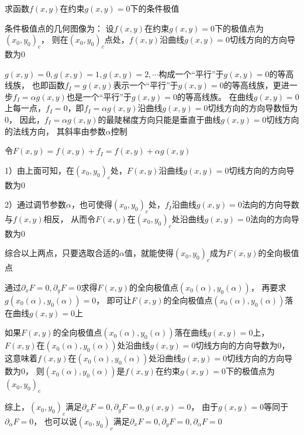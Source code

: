求函数$f(x,y)$在约束$g(x,y)=0$下的条件极值

条件极值点的几何图像为：
设$f(x,y)$在约束$g(x,y)=0$下的极值点为$(x_0,y_0)_c$，
则在$(x_0,y_0)_c$点处，$f(x,y)$沿曲线$g(x,y)=0$切线方向的方向导数为$0$

$g(x,y)=0,g(x,y)=1,g(x,y)=2,\cdots$构成一个“平行”于$g(x,y)=0$的等高线族，
也即函数$f_I=g(x,y)$表示一个“平行”于$g(x,y)=0$的等高线族，更进一步$f_I=\alpha g(x,y)$也是一个“平行”于$g(x,y)=0$的等高线族。
在曲线$g(x,y)=0$上每一点，$f_I=0$，即$f_I=\alpha g(x,y)$沿曲线$g(x,y)=0$切线方向的方向导数恒为$0$，
因此，$f_I=\alpha g(x,y)$的最陡梯度方向只能是垂直于曲线$g(x,y)=0$切线方向的法线方向，
其斜率由参数$\alpha$控制

令$F(x,y)=f(x,y)+f_I=f(x,y)+\alpha g(x,y)$

1）由上面可知，在$(x_0,y_0)_c$处，$F(x,y)$沿曲线$g(x,y)=0$切线方向的方向导数为$0$

2）通过调节参数$\alpha$，也可使得$(x_0,y_0)_c$处，$f_I$沿曲线$g(x,y)=0$法向的方向导数与$f(x,y)$相反，
从而令$F(x,y)$在$(x_0,y_0)_c$处沿曲线$g(x,y)=0$法向的方向导数为$0$

综合以上两点，只要选取合适的$\alpha$值，就能使得$(x_0,y_0)_c$成为$F(x,y)$的全向极值点

通过$\partial_x F=0,\partial_y F=0$求得$F(x,y)$的全向极值点$(x_0(\alpha),y_0(\alpha))$，
再要求$g(x_0(\alpha),y_0(\alpha))=0$，
即可让$F(x,y)$的全向极值点$(x_0(\alpha),y_0(\alpha))$落在曲线$g(x,y)=0$上

如果$F(x,y)$的全向极值点$(x_0(\alpha),y_0(\alpha))$落在曲线$g(x,y)=0$上，
$F(x,y)$在$(x_0(\alpha),y_0(\alpha))$处沿曲线$g(x,y)=0$切线方向的方向导数为$0$，
这意味着$f(x,y)$在$(x_0(\alpha),y_0(\alpha))$处沿曲线$g(x,y)=0$切线方向的方向导数为$0$，
则$(x_0(\alpha),y_0(\alpha))$是$f(x,y)$在约束$g(x,y)=0$下的极值点为$(x_0,y_0)_c$

综上，$(x_0,y_0)_c$满足$\partial_x F=0,\partial_y F=0,g(x,y)=0$，
由于$g(x,y)=0$等同于$\partial_\alpha F=0$，
也可以说$(x_0,y_0)_c$满足$\partial_x F=0,\partial_y F=0,\partial_\alpha F=0$

